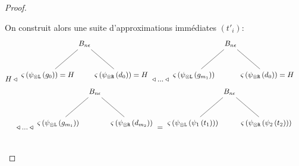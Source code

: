 \documentclass[11pt,a4paper]{article}
\theoremstyle{plain}
\theoremstyle{definition}
\theoremstyle{remark}
\newcommand*{\tensor}{\otimes}
\newcommand*{\someperm}{\varsigma}
\newcommand*{\Left}{\textnormal{\texttt{L}}}
\newcommand*{\Right}{\textnormal{\texttt{R}}}
\newcommand*{\relapprox}{\ensuremath{\triangleleft}}
\newcommand*{\unknown}{H}
\begin{document}
\begin{proof}
\begin{description}
            On construit alors une suite d'approximations immédiates $(t'_i):$
            \begin{align*}
                \begin{multlined}
                    \unknown
                    \relapprox
                    \begin{tikzpicture}%
                    [level distance=1.5cm,
                    level 1/.style={sibling distance=3.5cm}]
                    \node {$B_{n \epsilon}$}
                        child {node {$\someperm \left( \psi_{\tensor\Left} \left(
                        g_0\right) \right) = \unknown$}}
                        child {node {$\someperm \left( \psi_{\tensor\Right} \left(
                        d_0\right) \right) = \unknown$}
                    };
                    \end{tikzpicture}
                    \relapprox ... \relapprox
                    \begin{tikzpicture}%
                    [level distance=1.5cm,
                    level 1/.style={sibling distance=3.5cm}]
                    \node {$B_{n \epsilon}$}
                        child {node {$\someperm \left( \psi_{\tensor\Left} \left(
                        g_{m_1}\right) \right)$}}
                        child {node {$\someperm \left( \psi_{\tensor\Right} \left(
                        d_0\right) \right) = \unknown$}
                    };
                    \end{tikzpicture}\\
                    \relapprox ... \relapprox
                    \begin{tikzpicture}%
                    [level distance=1.5cm,
                    level 1/.style={sibling distance=3.5cm}]
                    \node {$B_{n \epsilon}$}
                        child {node {$\someperm \left( \psi_{\tensor\Left} \left(
                        g_{m_1}\right) \right)$}}
                        child {node {$\someperm \left( \psi_{\tensor\Right} \left(
                        d_{m_2}\right) \right)$}
                    };
                    \end{tikzpicture}
                    =
                    \begin{tikzpicture}%
                    [level distance=1.5cm,
                    level 1/.style={sibling distance=3.5cm}]
                    \node {$B_{n \epsilon}$}
                        child {node {$\someperm \left( \psi_{\tensor\Left} \left( \psi_1 \left(
                            t_1
                          \right) \right) \right)$}}
                        child {node {$\someperm \left( \psi_{\tensor\Right} \left( \psi_2 \left(
                            t_2
                          \right) \right) \right)$}
                    };
                    \end{tikzpicture}\\
                \end{multlined}
            \end{align*}
    

\end{description}
\end{proof}
\end{document}
